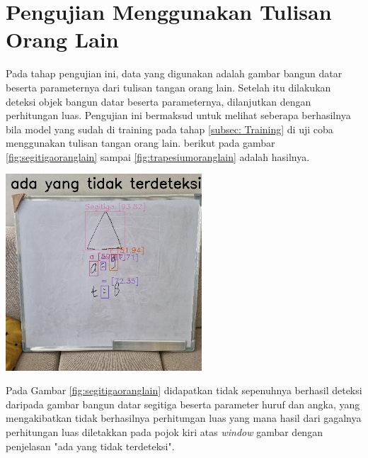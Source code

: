\section{Pengujian Menggunakan Tulisan Orang Lain}
Pada tahap pengujian ini, data yang digunakan adalah gambar bangun datar beserta parameternya dari tulisan tangan orang lain. Setelah itu dilakukan deteksi objek bangun datar beserta parameternya, dilanjutkan dengan perhitungan luas. Pengujian ini bermaksud untuk melihat seberapa berhasilnya bila model yang sudah di training pada tahap \ref{subsec: Training} di uji coba menggunakan tulisan tangan orang lain. berikut pada gambar \ref{fig:segitigaoranglain} sampai \ref{fig:trapesiumoranglain} adalah hasilnya.
\begin{center}
	\includegraphics[width=0.55\textwidth]{gambar/segitiga orang.png}
	\label{fig:segitigaoranglain}
\end{center}
Pada Gambar \ref{fig:segitigaoranglain} didapatkan tidak sepenuhnya berhasil deteksi daripada gambar bangun datar segitiga beserta parameter huruf dan angka, yang mengakibatkan tidak berhasilnya perhitungan luas yang mana hasil dari gagalnya perhitungan luas diletakkan pada pojok kiri atas \textit{window} gambar dengan penjelasan "ada yang tidak terdeteksi".

